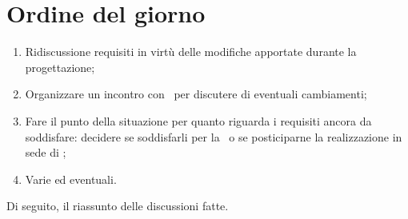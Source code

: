 \documentclass[../AnalisiDeiRequisiti.tex]{subfiles}
\begin{document}
	\section*{Ordine del giorno}
		\begin{enumerate}
			\item Ridiscussione requisiti in virtù delle modifiche apportate durante la progettazione;
			\item Organizzare un incontro con \proponente\ per discutere di eventuali cambiamenti;
			\item Fare il punto della situazione per quanto riguarda i requisiti ancora da soddisfare: decidere se soddisfarli per la \revisionediqualifica\ o se posticiparne la realizzazione in sede di \revisionediaccettazione;
			\item Varie ed eventuali.
		\end{enumerate}
		Di seguito, il riassunto delle discussioni fatte.
\end{document}
